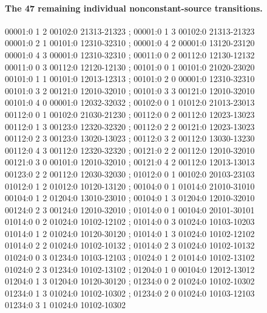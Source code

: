 \paragraph{The 47 remaining individual nonconstant-source transitions.}
\begingroup\scriptsize\ttfamily\begin{flushleft}
00001:0 1 2 00102:0 21313-21323 ; 00001:0 1 3 00102:0 21313-21323\\
00001:0 2 1 00101:0 12310-32310 ; 00001:0 4 2 00001:0 13120-23120\\
00001:0 4 3 00001:0 12310-32310 ; 00011:0 0 2 00112:0 12130-12132\\
00011:0 0 3 00112:0 12120-12130 ; 00101:0 0 1 00101:0 21020-23020\\
00101:0 1 1 00101:0 12013-12313 ; 00101:0 2 0 00001:0 12310-32310\\
00101:0 3 2 00121:0 12010-32010 ; 00101:0 3 3 00121:0 12010-32010\\
00101:0 4 0 00001:0 12032-32032 ; 00102:0 0 1 01012:0 21013-23013\\
00112:0 0 1 00102:0 21030-21230 ; 00112:0 0 2 00112:0 12023-13023\\
00112:0 1 3 00123:0 12320-32320 ; 00112:0 2 2 00121:0 12023-13023\\
00112:0 2 3 00123:0 13020-13023 ; 00112:0 3 2 00112:0 13030-13230\\
00112:0 4 3 00112:0 12320-32320 ; 00121:0 2 2 00112:0 12010-32010\\
00121:0 3 0 00101:0 12010-32010 ; 00121:0 4 2 00112:0 12013-13013\\
00123:0 2 2 00112:0 12030-32030 ; 01012:0 0 1 00102:0 20103-23103\\
01012:0 1 2 01012:0 10120-13120 ; 00104:0 0 1 01014:0 21010-31010\\
00104:0 1 2 01204:0 13010-23010 ; 00104:0 1 3 01204:0 12010-32010\\
00124:0 2 3 00124:0 12010-32010 ; 01014:0 0 1 00104:0 20101-30101\\
01014:0 0 2 01024:0 10102-12102 ; 01014:0 0 3 01024:0 10103-10203\\
01014:0 1 2 01024:0 10120-30120 ; 01014:0 1 3 01024:0 10102-12102\\
01014:0 2 2 01024:0 10102-10132 ; 01014:0 2 3 01024:0 10102-10132\\
01024:0 0 3 01234:0 10103-12103 ; 01024:0 1 2 01014:0 10102-13102\\
01024:0 2 3 01234:0 10102-13102 ; 01204:0 1 0 00104:0 12012-13012\\
01204:0 1 3 01204:0 10120-30120 ; 01234:0 0 2 01024:0 10102-10302\\
01234:0 1 3 01024:0 10102-10302 ; 01234:0 2 0 01024:0 10103-12103\\
01234:0 3 1 01024:0 10102-10302\\
\end{flushleft}\endgroup

